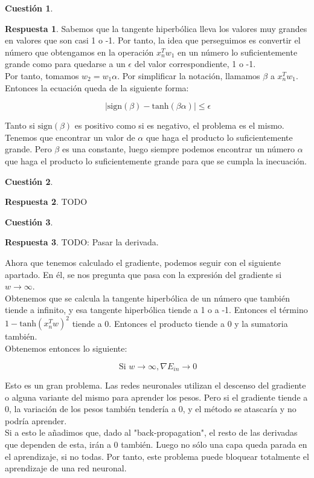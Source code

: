 \documentclass[10pt,a4paper]{article}
\theoremstyle{definition}
\newtheorem{cuestion}{Cuestión}
\newtheorem*{respuesta}{Respuesta}
\begin{document}
\begin{cuestion}
\end{cuestion}
\begin{respuesta}
Sabemos que la tangente hiperbólica lleva los valores muy grandes en valores que son casi 1 o -1. Por tanto, la idea que perseguimos es convertir el número que obtengamos en la operación $x_n^Tw_1$ en un número lo suficientemente grande como para quedarse a un $\epsilon$ del valor correspondiente, 1 o -1.\\

Por tanto, tomamos $w_2 =  w_1 \alpha$. Por simplificar la notación, llamamos $\beta$ a $x_n^Tw_1$. Entonces la ecuación queda de la siguiente forma:

\[
\ \left| \textrm{sign}(\beta)- \textrm{tanh}(\beta \alpha)\right| \leq \epsilon
\]

Tanto si $\textrm{sign}(\beta)$ es positivo como si es negativo, el problema es el mismo. Tenemos que encontrar un valor de $\alpha$ que haga el producto lo suficientemente grande. Pero $\beta$ es una constante, luego siempre podemos encontrar un número $\alpha$ que haga el producto lo suficientemente grande para que se cumpla la inecuación. 
\end{respuesta}

\begin{cuestion}
\end{cuestion}
\begin{respuesta}
TODO
\end{respuesta}

\begin{cuestion}
\end{cuestion}
\begin{respuesta}
TODO: Pasar la derivada.

Ahora que tenemos calculado el gradiente, podemos seguir con el siguiente apartado. En él, se nos pregunta que pasa con la expresión del gradiente si $w \rightarrow \infty$.\\

Obtenemos que se calcula la tangente hiperbólica de un número que también tiende a infinito, y esa tangente hiperbólica tiende a 1 o a -1. Entonces el término $1-\textrm{tanh}(x_n^Tw)^2$ tiende a 0. Entonces el producto tiende a 0 y la sumatoria también.\\
 
Obtenemos entonces lo siguiente:

\[
\ \textrm{Si }w \rightarrow \infty ,  \nabla E_{in} \rightarrow 0
\]

Esto es un gran problema. Las redes neuronales utilizan el descenso del gradiente o alguna variante del mismo para aprender los pesos. Pero si el gradiente tiende a 0, la variación de los pesos también tendería a 0, y el método se atascaría y no podría aprender.\\

Si a esto le añadimos que, dado al "back-propagation", el resto de las derivadas que dependen de esta, irán a 0 también. Luego no sólo una capa queda parada en el aprendizaje, si no todas. Por tanto, este problema puede bloquear totalmente el aprendizaje de una red neuronal.

\end{respuesta}
\end{document}
